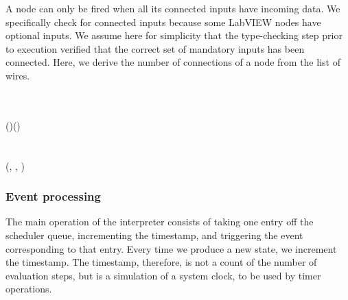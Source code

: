 A node can only be fired when all its connected inputs have incoming data. We
specifically check for connected inputs because some LabVIEW nodes have
optional inputs. We assume here for simplicity that the type-checking step
prior to execution verified that the correct set of mandatory inputs has been
connected. Here, we derive the number of connections of a node from the list
of wires.

\begin{hscode}\SaveRestoreHook
{}%
%
%
%
\>[B]{}\mathbin{::}\to {}\to {}\<[E]%
\\
\>[B]{}\;\;\mathrel{=}{}\<[E]%
\\
\>[B]{}\<[4]%
\>[4]{}\mathbin{+}\;\;(\mathbin{-})\;(\;){}\<[E]%
\\
\>[B]{}\<[4]%
\>[4]{}\<[E]%
\\
\>[4]{}\<[7]%
\>[7]{}\mathbin{::}\to {}\to {}\<[E]%
\\
\>[4]{}\<[7]%
\>[7]{}\;\;(\;\anonymous \;\llparenthesis {}, , \rrparenthesis )\mid {}\equiv {}\mathrel{=}\;\;\<[E]%
\\
\>[4]{}\<[7]%
\>[7]{}\;\;\anonymous \mathrel{=}\<[E]%
\ColumnHook
\end{hscode}\resethooks

\subsubsection{Event processing}
\label{run}

The main operation of the interpreter consists of taking one entry off the
scheduler queue, incrementing the timestamp, and triggering the event corresponding
to that entry. Every time we produce a new state, we increment the timestamp.
The timestamp, therefore, is not a count of the number of evaluation steps, but
is a simulation of a system clock, to be used by timer operations.

